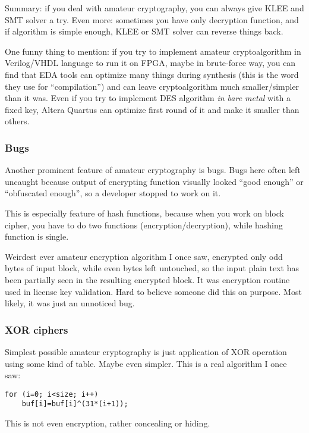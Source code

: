 Summary: if you deal with amateur cryptography, you can always give KLEE and SMT solver a try.
Even more: sometimes you have only decryption function, and if algorithm is simple enough,
KLEE or SMT solver can reverse things back.

One funny thing to mention: if you try to implement amateur cryptoalgorithm in Verilog/VHDL language to run it on \ac{FPGA},
maybe in brute-force way,
you can find that \ac{EDA} tools can optimize many things during synthesis
(this is the word they use for ``compilation'') and can leave cryptoalgorithm much smaller/simpler than it was.
Even if you try to implement \ac{DES} algorithm \textit{in bare metal} with a fixed key,
Altera Quartus can optimize first round of it and make it smaller than others.

\subsubsection{Bugs}

Another prominent feature of amateur cryptography is bugs.
Bugs here often left uncaught because output of encrypting function visually looked ``good enough'' or ``obfuscated enough'',
so a developer stopped to work on it.

This is especially feature of hash functions, because when you work on block cipher, you have to do two functions
(encryption/decryption), while hashing function is single.

Weirdest ever amateur encryption algorithm I once saw, encrypted only odd bytes of input block, while even bytes
left untouched, so the input plain text has been partially seen in the resulting encrypted block.
It was encryption routine used in license key validation.
Hard to believe someone did this on purpose.
Most likely, it was just an unnoticed bug.

\subsubsection{XOR ciphers}

Simplest possible amateur cryptography is just application of XOR operation using some kind of table.
Maybe even simpler. This is a real algorithm I once saw:

\begin{lstlisting}
for (i=0; i<size; i++)
    buf[i]=buf[i]^(31*(i+1));
\end{lstlisting}

This is not even encryption, rather concealing or hiding.

